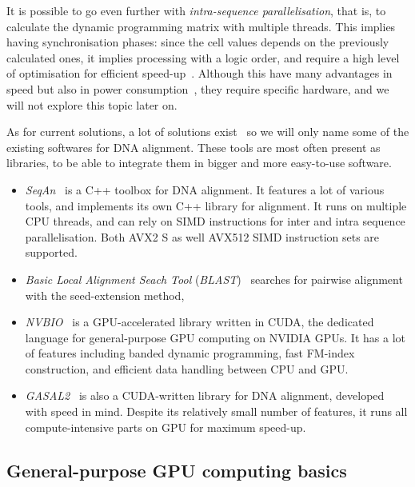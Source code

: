 It is possible to go even further with \emph{intra-sequence parallelisation}, that is, to calculate the dynamic programming matrix with multiple threads. This implies having synchronisation phases: since the cell values depends on the previously calculated ones, it implies processing with a logic order, and require a high level of optimisation for efficient speed-up~\cite{Houtgast:gpu-accelerated}. Although this have many advantages in speed but also in power consumption~\cite{Houtgast:power-efficiency}, they require specific hardware, and we will not explore this topic later on.

As for current solutions, a lot of solutions exist~\cite{wiki:ListAlignmentSoft} so we will only name some of the existing softwares for DNA alignment. These tools are most often present as libraries, to be able to integrate them in bigger and more easy-to-use software.

\begin{itemize}
    \item \emph{SeqAn}~\cite{Doring:seqan} is a C++ toolbox for DNA alignment. It features a lot of various tools, and implements its own C++ library for alignment. It runs on multiple CPU threads, and can rely on SIMD instructions for inter and intra sequence parallelisation. Both AVX2 S as well AVX512 SIMD instruction sets are supported.
    \item \emph{Basic Local Alignment Seach Tool} (\emph{BLAST})~\cite{Altschul:BLAST} searches for pairwise alignment with the seed-extension method,
    \item \emph{NVBIO}~\cite{nvidia:nvbio} is a GPU-accelerated library written in CUDA, the dedicated language for general-purpose GPU computing on NVIDIA GPUs. It has a lot of features including banded dynamic programming, fast FM-index construction, and efficient data handling between CPU and GPU.
    \item \emph{GASAL2}~\cite{Ahmed:gasal2} is also a CUDA-written library for DNA alignment, developed with speed in mind. Despite its relatively small number of features, it runs all compute-intensive parts on GPU for maximum speed-up.
\end{itemize}


\subsection{General-purpose GPU computing basics}

